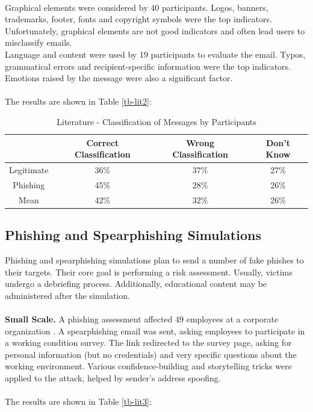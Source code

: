 \documentclass[a4paper]{article}
\begin{document}
\\
Graphical elements were considered by 40 participants. Logos, banners, trademarks, footer, fonts and copyright symbols were the top indicators. Unfortunately, graphical elements are not good indicators and often lead users to misclassify emails.
\\
Language and content were used by 19 participants to evaluate the email. Typos, grammatical errors and recipient-specific information were the top indicators. Emotions raised by the message were also a significant factor.
\\ \\
The results are shown in Table \ref{tb-lit2}:

\smallskip

\begingroup
\renewcommand{\arraystretch}{1.25}
\begin{table}[ht]
\begin{center}
    \begin{tabular}{ | c | c | c | c | }
    \hline
    \textbf{} & \textbf{Correct Classification} & \textbf{Wrong Classification} & \textbf{Don't Know} \\ \hline
    Legitimate & 36\% & 37\% & 27\% \\ \hline
    Phishing & 45\% & 28\% & 26\% \\ \hline
    Mean & 42\% & 32\% & 26\% \\ \hline
    \end{tabular}
\end{center}
\caption{Literature - Classification of Messages by Participants \cite{lit-casestudy-assessing-soceng}}
\end{table}
\label{tb-lit2}
\endgroup

\subsection{Phishing and Spearphishing Simulations}

Phishing and spearphishing simulations plan to send a number of fake phishes to their targets. Their core goal is performing a risk assessment. Usually, victims undergo a debriefing process. Additionally, educational content may be administered after the simulation.
\\ \\
\textbf{Small Scale.} A phishing assessment affected 49 employees at a corporate organization \cite{lit-casestudy-revisiting-susceptibility}. A spearphishing email was sent, asking employees to participate in a working condition survey. The link redirected to the survey page, asking for personal information (but no credentials) and very specific questions about the working environment. Various confidence-building and storytelling tricks were applied to the attack, helped by sender's address spoofing. 
\\ \\
The results are shown in Table \ref{tb-lit3}:
\end{document}
